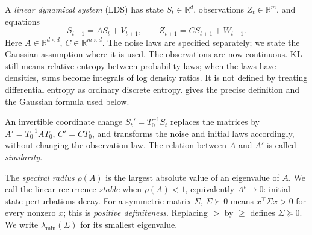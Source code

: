 \documentclass[11pt,twoside]{article}
\newcommand{\R}{\mathbb R}
\theoremstyle{definition}
\theoremstyle{remark}
\begin{document}
A \emph{linear dynamical system} (LDS) has state \(S_t\in\R^d\), observations \(Z_t\in\R^m\),
and equations
\begin{equation}
 S_{t+1}=AS_t+V_{t+1},\qquad
 Z_{t+1}=CS_{t+1}+W_{t+1}.
 \label{eq:linear-ssm}
\end{equation}
Here \(A\in\R^{d\times d}\), \(C\in\R^{m\times d}\).
The noise laws are specified separately; we state the Gaussian assumption
where it is used.
The observations are now continuous. KL still means relative entropy between
probability laws; when the laws have densities, sums become integrals of log
density ratios. It is not defined by treating differential entropy as ordinary
discrete entropy.  gives the precise definition and the
Gaussian formula used below.

An invertible coordinate change \(S_t'=T_0^{-1}S_t\) replaces the matrices by
\(A'=T_0^{-1}AT_0\), \(C'=CT_0\), and transforms the noise and initial
laws accordingly, without changing the observation law.
The relation between \(A\) and \(A'\) is called \emph{similarity}.

The \emph{spectral radius} \(\rho(A)\) is the largest absolute value of
an eigenvalue of \(A\). We call the linear recurrence \emph{stable} when
\(\rho(A)<1\), equivalently \(A^t\to0\): initial-state perturbations decay.
For a symmetric matrix \(\Sigma\), \(\Sigma\succ0\) means
\(x^\top\Sigma x>0\) for every nonzero \(x\); this is \emph{positive
definiteness}. Replacing \(>\) by \(\ge\) defines \(\Sigma\succeq0\).
We write \(\lambda_{\min}(\Sigma)\) for its smallest eigenvalue.
\end{document}

